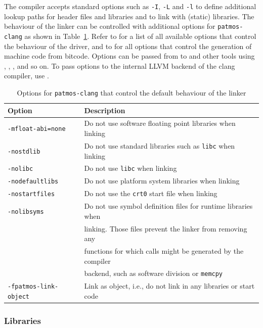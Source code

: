 The compiler accepts standard options such as \texttt{-I}, \texttt{-L} and \texttt{-l} to define additional
lookup paths for header files and libraries and to link with (static) libraries.
The behaviour of the linker can be controlled with additional options for \texttt{patmos-clang} 
as shown in Table~\ref{tab:linker_options}.
Refer to  for a list of all available options that control the behaviour of
the driver, and to  for all options that control the generation of machine code from
bitcode. Options can be passed from  to  and other tools using ,
, ,  and so on.
To pass options to the internal LLVM backend of the clang compiler, use .

\begin{table}
\centering
\begin{tabular}{ll}
Option & Description \\ \hline
\texttt{-mfloat-abi=none} & Do not use software floating point libraries when linking \\
\texttt{-nostdlib} & Do not use standard libraries such as \texttt{libc} when linking \\
\texttt{-nolibc} & Do not use \texttt{libc} when linking \\
\texttt{-nodefaultlibs} & Do not use platform system libraries when linking\\
\texttt{-nostartfiles} & Do not use the \texttt{crt0} start file when linking \\
\texttt{-nolibsyms} & Do not use symbol definition files for runtime libraries when\\
                    & linking. Those files prevent the linker from removing any \\
		    & functions for which calls might be generated by the compiler \\
		    & backend, such as software division or \texttt{memcpy} \\
\texttt{-fpatmos-link-object} & Link as object, i.e., do not link in any libraries or start code 
\end{tabular}
\caption{Options for \texttt{patmos-clang} that control the default behaviour of the linker}
\label{tab:linker_options}
\end{table}

\subsubsection{Libraries}

